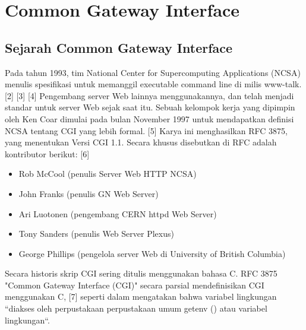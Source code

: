 ﻿\section{Common Gateway Interface}
\subsection{Sejarah Common Gateway Interface}
Pada tahun 1993, tim National Center for Supercomputing Applications (NCSA) menulis spesifikasi untuk memanggil executable command line di milis www-talk. [2] [3] [4] Pengembang server Web lainnya menggunakannya, dan telah menjadi standar untuk server Web sejak saat itu. Sebuah kelompok kerja yang dipimpin oleh Ken Coar dimulai pada bulan November 1997 untuk mendapatkan definisi NCSA tentang CGI yang lebih formal. [5] Karya ini menghasilkan RFC 3875, yang menentukan Versi CGI 1.1. Secara khusus disebutkan di RFC adalah kontributor berikut: [6]
\begin{itemize}
\item Rob McCool (penulis Server Web HTTP NCSA)
\item John Franks (penulis GN Web Server)
\item Ari Luotonen (pengembang CERN httpd Web Server)
\item Tony Sanders (penulis Web Server Plexus)
\item George Phillips (pengelola server Web di University of British Columbia)
\end{itemize}
Secara historis skrip CGI sering ditulis menggunakan bahasa C. RFC 3875 "Common Gateway Interface (CGI)" secara parsial mendefinisikan CGI menggunakan C, [7] seperti dalam mengatakan bahwa variabel lingkungan ``diakses oleh perpustakaan perpustakaan umum getenv () atau variabel lingkungan``.  \cite{mccool1993common}
